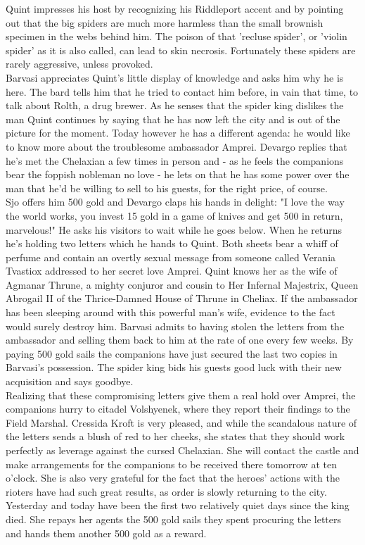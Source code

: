 Quint impresses his host by recognizing his Riddleport accent and by pointing out that the big spiders are much more harmless than the small brownish specimen in the webs behind him. The poison of that 'recluse spider', or 'violin spider' as it is also called, can lead to skin necrosis. Fortunately these spiders are rarely aggressive, unless provoked.\\

Barvasi appreciates Quint's little display of knowledge and asks him why he is here. The bard tells him that he tried to contact him before, in vain that time, to talk about Rolth, a drug brewer. As he senses that the spider king dislikes the man Quint continues by saying that he has now left the city and is out of the picture for the moment. Today however he has a different agenda: he would like to know more about the troublesome ambassador Amprei. Devargo replies that he's met the Chelaxian a few times in person and - as he feels the companions bear the foppish nobleman no love - he lets on that he has some power over the man that he'd be willing to sell to his guests, for the right price, of course.\\

Sjo offers him 500 gold and Devargo claps his hands in delight: "I love the way the world works, you invest 15 gold in a game of knives and get 500 in return, marvelous!" He asks his visitors to wait while he goes below. When he returns he's holding two letters which he hands to Quint. Both sheets bear a whiff of perfume and contain an overtly sexual message from someone called Verania Tvastiox addressed to her secret love Amprei. Quint knows her as the wife of Agmanar Thrune, a mighty conjuror and cousin to Her Infernal Majestrix, Queen Abrogail II of the Thrice-Damned House of Thrune in Cheliax. If the ambassador has been sleeping around with this powerful man's wife, evidence to the fact would surely destroy him. Barvasi admits to having stolen the letters from the ambassador and selling them back to him at the rate of one every few weeks. By paying 500 gold sails the companions have just secured the last two copies in Barvasi's possession. The spider king bids his guests good luck with their new acquisition and says goodbye.\\

Realizing that these compromising letters give them a real hold over Amprei, the companions hurry to citadel Volshyenek, where they report their findings to the Field Marshal. Cressida Kroft is very pleased, and while the scandalous nature of the letters sends a blush of red to her cheeks, she states that they should work perfectly as leverage against the cursed Chelaxian. She will contact the castle and make arrangements for the companions to be received there tomorrow at ten o'clock. She is also very grateful for the fact that the heroes' actions with the rioters have had such great results, as order is slowly returning to the city. Yesterday and today have been the first two relatively quiet days since the king died. She repays her agents the 500 gold sails they spent procuring the letters and hands them another 500 gold as a reward.\\


